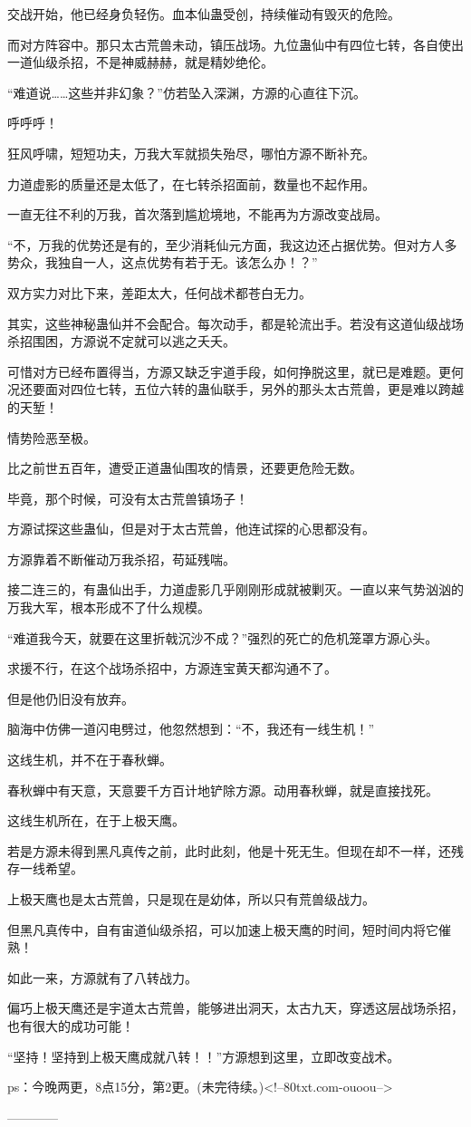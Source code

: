 \begin{this_body}
交战开始，他已经身负轻伤。血本仙蛊受创，持续催动有毁灭的危险。

而对方阵容中。那只太古荒兽未动，镇压战场。九位蛊仙中有四位七转，各自使出一道仙级杀招，不是神威赫赫，就是精妙绝伦。

“难道说……这些并非幻象？”仿若坠入深渊，方源的心直往下沉。

呼呼呼！

狂风呼啸，短短功夫，万我大军就损失殆尽，哪怕方源不断补充。

力道虚影的质量还是太低了，在七转杀招面前，数量也不起作用。

一直无往不利的万我，首次落到尴尬境地，不能再为方源改变战局。

“不，万我的优势还是有的，至少消耗仙元方面，我这边还占据优势。但对方人多势众，我独自一人，这点优势有若于无。该怎么办！？”

双方实力对比下来，差距太大，任何战术都苍白无力。

其实，这些神秘蛊仙并不会配合。每次动手，都是轮流出手。若没有这道仙级战场杀招围困，方源说不定就可以逃之夭夭。

可惜对方已经布置得当，方源又缺乏宇道手段，如何挣脱这里，就已是难题。更何况还要面对四位七转，五位六转的蛊仙联手，另外的那头太古荒兽，更是难以跨越的天堑！

情势险恶至极。

比之前世五百年，遭受正道蛊仙围攻的情景，还要更危险无数。

毕竟，那个时候，可没有太古荒兽镇场子！

方源试探这些蛊仙，但是对于太古荒兽，他连试探的心思都没有。

方源靠着不断催动万我杀招，苟延残喘。

接二连三的，有蛊仙出手，力道虚影几乎刚刚形成就被剿灭。一直以来气势汹汹的万我大军，根本形成不了什么规模。

“难道我今天，就要在这里折戟沉沙不成？”强烈的死亡的危机笼罩方源心头。

求援不行，在这个战场杀招中，方源连宝黄天都沟通不了。

但是他仍旧没有放弃。

脑海中仿佛一道闪电劈过，他忽然想到：“不，我还有一线生机！”

这线生机，并不在于春秋蝉。

春秋蝉中有天意，天意要千方百计地铲除方源。动用春秋蝉，就是直接找死。

这线生机所在，在于上极天鹰。

若是方源未得到黑凡真传之前，此时此刻，他是十死无生。但现在却不一样，还残存一线希望。

上极天鹰也是太古荒兽，只是现在是幼体，所以只有荒兽级战力。

但黑凡真传中，自有宙道仙级杀招，可以加速上极天鹰的时间，短时间内将它催熟！

如此一来，方源就有了八转战力。

偏巧上极天鹰还是宇道太古荒兽，能够进出洞天，太古九天，穿透这层战场杀招，也有很大的成功可能！

“坚持！坚持到上极天鹰成就八转！！”方源想到这里，立即改变战术。

ps：今晚两更，8点15分，第2更。(未完待续。)<!--80txt.com-ouoou-->

------------

\end{this_body}

